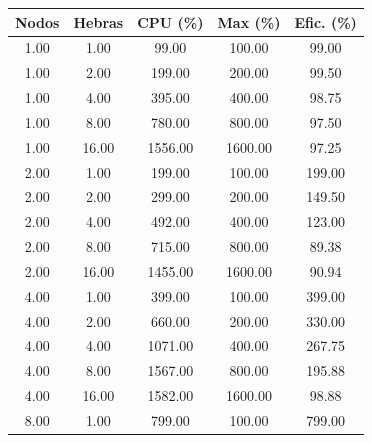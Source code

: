 \begin{table}[ht]
    \centering
    \begin{tabular}{|c|c|c|c|c|}
        \hline
        \textbf{Nodos} & \textbf{Hebras} & \textbf{CPU (\%)} & \textbf{Max (\%)} & \textbf{Efic. (\%)} \\
        \hline
        1.00           & 1.00            & 99.00             & 100.00            & 99.00               \\
        1.00           & 2.00            & 199.00            & 200.00            & 99.50               \\
        1.00           & 4.00            & 395.00            & 400.00            & 98.75               \\
        1.00           & 8.00            & 780.00            & 800.00            & 97.50               \\
        1.00           & 16.00           & 1556.00           & 1600.00           & 97.25               \\
        2.00           & 1.00            & 199.00            & 100.00            & 199.00              \\
        2.00           & 2.00            & 299.00            & 200.00            & 149.50              \\
        2.00           & 4.00            & 492.00            & 400.00            & 123.00              \\
        2.00           & 8.00            & 715.00            & 800.00            & 89.38               \\
        2.00           & 16.00           & 1455.00           & 1600.00           & 90.94               \\
        4.00           & 1.00            & 399.00            & 100.00            & 399.00              \\
        4.00           & 2.00            & 660.00            & 200.00            & 330.00              \\
        4.00           & 4.00            & 1071.00           & 400.00            & 267.75              \\
        4.00           & 8.00            & 1567.00           & 800.00            & 195.88              \\
        4.00           & 16.00           & 1582.00           & 1600.00           & 98.88               \\
        8.00           & 1.00            & 799.00            & 100.00            & 799.00              \\

\end{tabular}
\end{table}

